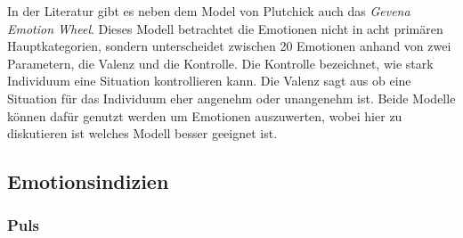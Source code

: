 In der Literatur gibt es neben dem Model von Plutchick auch das \textit{Gevena Emotion Wheel}. Dieses Modell betrachtet die Emotionen nicht in acht primären Hauptkategorien, sondern unterscheidet zwischen 20 Emotionen anhand von zwei Parametern, die Valenz und die Kontrolle. Die Kontrolle bezeichnet, wie stark Individuum eine Situation kontrollieren kann. Die Valenz sagt aus ob eine Situation für das Individuum eher angenehm oder unangenehm ist.\newline 
Beide Modelle können dafür genutzt werden um Emotionen auszuwerten, wobei hier zu diskutieren ist welches Modell besser geeignet ist.
\subsection{Emotionsindizien}
\subsubsection{Puls}
